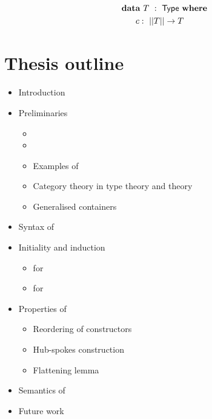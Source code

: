 \documentclass[a4paper,10pt]{report}
\begin{document}
\begin{alignat*}{2}
  &\rlap{$\data\ T\ :\ \Type\ \where$} \\
  &&\ \ c     &:\ || T || \to T
\end{alignat*}



\chapter{Thesis outline}
\label{sec:outline}

\begin{itemize}
\item Introduction
\item Preliminaries
  \begin{itemize}
  \item \mltt
  \item \Hott
  \item Examples of \hits
  \item Category theory in type theory and \omegacat theory
  \item Generalised containers
  \end{itemize}
\item Syntax of \hits
\item Initiality and induction
  \begin{itemize}
  \item for \oits
  \item for \hits
  \end{itemize}
\item Properties of \hits
  \begin{itemize}
  \item Reordering of constructors
  \item Hub-spokes construction
  \item Flattening lemma
  \end{itemize}
\item Semantics of \hits
\item Future work
\end{itemize}

\newpage

\listoftodos
\todototoc


\end{document}
